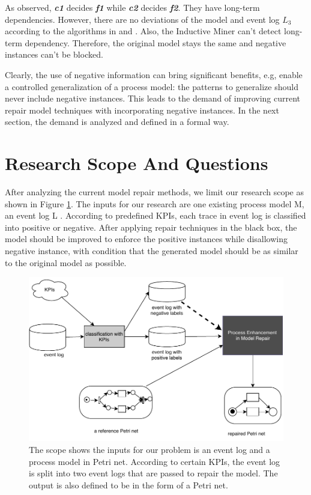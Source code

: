 As observed, \textbf{\emph{c1}} decides \textbf{\emph{f1}} while \textbf{\emph{c2}} decides \textbf{\emph{f2}}. They have long-term dependencies.
However, there are no deviations of the model and event log $L_3$ according to the  algorithms in  \cite{fahland2015model} and  \cite{dees2017enhancing}. Also, the Inductive Miner can't detect long-term dependency. Therefore, the original model stays the same and negative instances can't be blocked.

Clearly, the use of negative information can bring significant benefits, e.g, enable a controlled generalization of a process model: the patterns to generalize should never include negative instances. This leads to the demand of improving current repair model techniques with incorporating negative instances. In the next section, the demand is analyzed and defined in a formal way.

\section{Research Scope And Questions }
After analyzing the current model repair methods, we limit our research scope as shown in Figure \ref{fig:scope}.  The inputs for our research are one existing process model M, an event log L . According to predefined KPIs, each trace in event log is classified into positive or negative. After applying repair techniques in the black box, the model should be improved to enforce the positive instances while disallowing negative instance, with condition that the generated model should be as similar to the original model as possible. 
\begin{figure}
	\centering
	\includegraphics[width=\textwidth]{figures/introduction/P06-problem-scope.pdf}
	\caption[The reseach problem scope]{The scope shows the inputs for our problem is an event log and a process model in Petri net. According to certain KPIs, the event log is split into two event logs that are passed to repair the model. The output is also defined to be in the form of a Petri net. }
	\label{fig:scope}
\end{figure}

